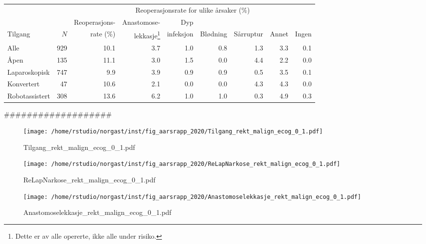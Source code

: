\documentclass[norsk,a4paper]{article}\usepackage[]{graphicx}\usepackage[]{color}
\begin{document}
\begin{table}[htb]
\begin{minipage}{\textwidth}
\centering
\begin{tabular}{lrrrrrrrr}
  \toprule
  & & & \multicolumn{4}{c}{Reoperasjonsrate for ulike årsaker (\%)} \\
 \cline{4-9} 
 & & Reoperasjons- & Anastomose- & Dyp &&&&  \\
 Tilgang & $N$ & rate (\%) & lekkasje\footnote[2]{Dette er av alle opererte, ikke
alle under risiko.} & infeksjon & Blødning & Sårruptur & Annet & Ingen \\
 \midrule
Alle & 929 & 10.1 & 3.7 & 1.0 & 0.8 & 1.3 & 3.3 & 0.1 \\ 
  Åpen & 135 & 11.1 & 3.0 & 1.5 & 0.0 & 4.4 & 2.2 & 0.0 \\ 
  Laparoskopisk & 747 & 9.9 & 3.9 & 0.9 & 0.9 & 0.5 & 3.5 & 0.1 \\ 
  Konvertert & 47 & 10.6 & 2.1 & 0.0 & 0.0 & 4.3 & 4.3 & 0.0 \\ 
  Robotassistert & 308 & 13.6 & 6.2 & 1.0 & 1.0 & 0.3 & 4.9 & 0.3 \\ 
   \bottomrule
\end{tabular}

\end{minipage}
\end{table}

###################




\begin{figure}[ht]
\centering
\texttt{[image: /home/rstudio/norgast/inst/fig\_aarsrapp\_2020/Tilgang\_rekt\_malign\_ecog\_0\_1.pdf]}
\caption{Tilgang\_rekt\_malign\_ecog\_0\_1.pdf}
\end{figure}

\begin{figure}[ht]
\centering
\texttt{[image: /home/rstudio/norgast/inst/fig\_aarsrapp\_2020/ReLapNarkose\_rekt\_malign\_ecog\_0\_1.pdf]}
\caption{ReLapNarkose\_rekt\_malign\_ecog\_0\_1.pdf}
\end{figure}

\begin{figure}[ht]
\centering
\texttt{[image: /home/rstudio/norgast/inst/fig\_aarsrapp\_2020/Anastomoselekkasje\_rekt\_malign\_ecog\_0\_1.pdf]}
\caption{Anastomoselekkasje\_rekt\_malign\_ecog\_0\_1.pdf}
\end{figure}
\end{document}
